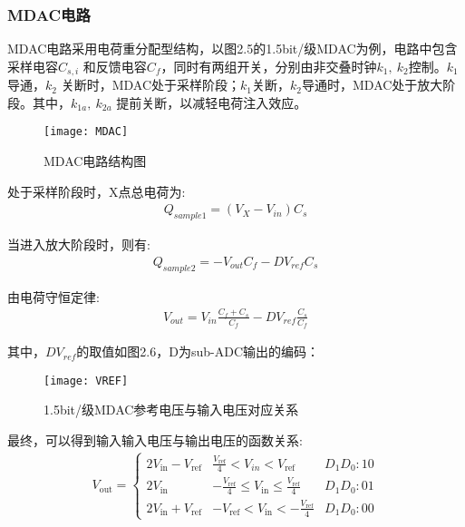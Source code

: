 \subsubsection{MDAC电路}
    MDAC电路采用电荷重分配型结构，以图2.5的1.5bit/级MDAC为例，电路中包含采样电容$ C_{s,i} $
    和反馈电容$ C_f $，同时有两组开关，分别由非交叠时钟$ k_1,\ k_2 $控制。$ k_1 $导通，$ k_2 $
    关断时，MDAC处于采样阶段；$ k_1 $关断，$ k_2 $导通时，MDAC处于放大阶段。其中，$ k_{1a},\ k_{2a} $
    提前关断，以减轻电荷注入效应。
    \begin{figure}[ht]
        \centering
        \texttt{[image: MDAC]}
        \caption{\label{fig:MDAC}MDAC电路结构图}
    \end{figure}
    \par 处于采样阶段时，X点总电荷为: \\
    \begin{align}
        Q_{sample1}=\left(V_{X}-V_{in}\right)C_s
    \end{align}
    \par 当进入放大阶段时，则有: \\
    \begin{align}
        Q_{sample2}= -V_{out}C_f - DV_{ref}C_s
    \end{align}
    \par 由电荷守恒定律: \\
    \begin{align}
        V_{out} = V_{in}\frac{C_f+C_s}{C_f} - DV_{ref}\frac{C_s}{C_f}
    \end{align}
    \par 其中，$ DV_{ref} $的取值如图2.6，D为sub-ADC输出的编码：\\
    \begin{figure}[ht]
        \centering
        \texttt{[image: VREF]}
        \caption{\label{fig:VREF}1.5bit/级MDAC参考电压与输入电压对应关系}
    \end{figure}
    \par 最终，可以得到输入输入电压与输出电压的函数关系: \\
    \begin{align}
        V_{\text {out}}=
        \left\{
            \begin{array}{ccc}{2 V_{\text {in}}-V_{\text {ref}}} & {\frac{V_{\text {ref}}}{4}<V_{i n}<V_{\text {ref}}} & {D_1D_0:10} \\
             {2 V_{\text {in}}} & {-\frac{V_{\text {ref}}}{4} \leq V_{\text {in}} \leq \frac{V_{\text {ref}}}{4}} & {D_1D_0:01} \\
             {2 V_{\text {in}}+V_{\text {ref}}} & {-V_{\text {ref}}<V_{\text {in}}<-\frac{V_{\text {ref}}}{4}} & {D_1D_0:00}
            \end{array}
        \right.
    \end{align}
    
